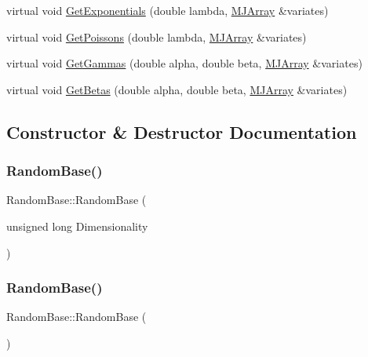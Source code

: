 \begin{DoxyCompactItemize}
\item 
virtual void \hyperlink{classRandomBase_ad1d2c39a8440f67cffda3ad41a4f9975}{Get\+Exponentials} (double lambda, \hyperlink{classMJArray}{M\+J\+Array} \&variates)
\item 
virtual void \hyperlink{classRandomBase_aa2e79f1f4c55c36df9c701d29e9b08a5}{Get\+Poissons} (double lambda, \hyperlink{classMJArray}{M\+J\+Array} \&variates)
\item 
virtual void \hyperlink{classRandomBase_a5b5c89afe295ba49a5474cdc3bf80c3d}{Get\+Gammas} (double alpha, double beta, \hyperlink{classMJArray}{M\+J\+Array} \&variates)
\item 
virtual void \hyperlink{classRandomBase_aa3f3efa1333ab5d7689b8cc7ebd26622}{Get\+Betas} (double alpha, double beta, \hyperlink{classMJArray}{M\+J\+Array} \&variates)
\end{DoxyCompactItemize}


\subsection{Constructor \& Destructor Documentation}
\hypertarget{classRandomBase_aad3e1066f029fb33bfe69cac638f54f3}{}\label{classRandomBase_aad3e1066f029fb33bfe69cac638f54f3} 
\subsubsection{\texorpdfstring{Random\+Base()}{RandomBase()}\hspace{0.1cm}{\footnotesize\ttfamily [1/2]}}
{\footnotesize\ttfamily Random\+Base\+::\+Random\+Base (\begin{DoxyParamCaption}\item[{unsigned long}]{Dimensionality }\end{DoxyParamCaption})\hspace{0.3cm}{\ttfamily [explicit]}}

\hypertarget{classRandomBase_a3594200fbb6d528a4a36374f2a25afee}{}\label{classRandomBase_a3594200fbb6d528a4a36374f2a25afee} 
\subsubsection{\texorpdfstring{Random\+Base()}{RandomBase()}\hspace{0.1cm}{\footnotesize\ttfamily [2/2]}}
{\footnotesize\ttfamily Random\+Base\+::\+Random\+Base (\begin{DoxyParamCaption}{ }\end{DoxyParamCaption})\hspace{0.3cm}{\ttfamily [inline]}}

